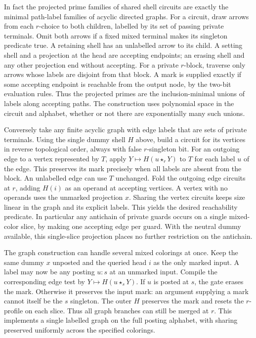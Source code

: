 In fact the projected prime families of shared shell
circuits are exactly the minimal path-label families
of acyclic directed graphs. For a circuit, draw
arrows from each $r$-choice to both children, labelled
by its set of passing private terminals. Omit both
arrows if a fixed mixed terminal makes its singleton
predicate true. A retaining shell has an unlabelled
arrow to its child. A setting shell and a projection
at the head are accepting endpoints; an erasing
shell and any other projection end without accepting.
For a private $r$-block, traverse only arrows whose
labels are disjoint from that block. A mark is
supplied exactly if some accepting endpoint is
reachable from the output node, by the two-bit
evaluation rules. Thus the projected primes are
the inclusion-minimal unions of labels along
accepting paths. The construction uses polynomial
space in the circuit and alphabet, whether or not
there are exponentially many such unions.

Conversely take any finite acyclic graph with edge
labels that are sets of private terminals. Using
the single dummy shell $H$ above, build a circuit
for its vertices in reverse topological order,
always with false $r$-singleton bit. For an outgoing
edge to a vertex represented by $T$, apply
$Y\mapsto H(u\star_r Y)$ to $T$ for each label
$u$ of the edge. This preserves its mark precisely
when all labels are absent from the block. An
unlabelled edge can use $T$ unchanged. Fold the
outgoing edge circuits at $r$, adding $H(i)$
as an operand at accepting vertices. A vertex
with no operands uses the unmarked projection
$x$. Sharing the vertex circuits keeps size
linear in the graph and its explicit labels.
This yields the desired reachability predicate.
In particular any antichain of private guards
occurs on a single mixed-color slice, by making
one accepting edge per guard. With the neutral
dummy available, this single-slice projection
places no further restriction on the antichain.

The graph construction can handle several mixed
colorings at once. Keep the same dummy $x$
unposted and the queried head $i$ as the only
marked input. A label may now be any posting
$u:s$ at an unmarked input. Compile the
corresponding edge test by $Y\mapsto
H(u\star_s Y)$. If $u$ is posted at $s$, the
gate erases the mark. Otherwise it preserves
the input mark: an argument supplying a mark
cannot itself be the $s$ singleton. The outer
$H$ preserves the mark and resets the
$r$-profile on each slice. Thus all graph
branches can still be merged at $r$. This
implements a single labelled graph on the
full posting alphabet, with sharing preserved
uniformly across the specified colorings.


